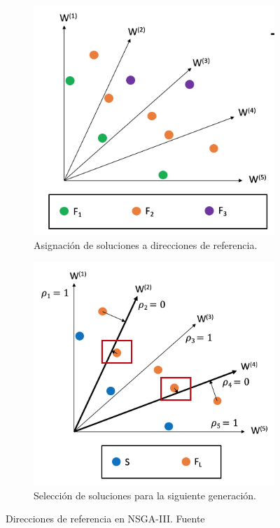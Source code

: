\begin{figure}[h]
  \centering
  \begin{subfigure}{0.45\textwidth}
      \centering
      \includegraphics[width=\linewidth]{figures/nsga3_1.png}
      \caption{Asignación de soluciones a direcciones de referencia.}
  \end{subfigure}
  \hfill
  \begin{subfigure}{0.45\textwidth}
      \centering
      \includegraphics[width=\linewidth]{figures/nsga3_2.png}
      \caption{Selección de soluciones para la siguiente generación.}
  \end{subfigure}
  \caption{Direcciones de referencia en NSGA-III. Fuente \cite{pymoo_nsga3}}
  \label{fig:nsga3}
\end{figure}

